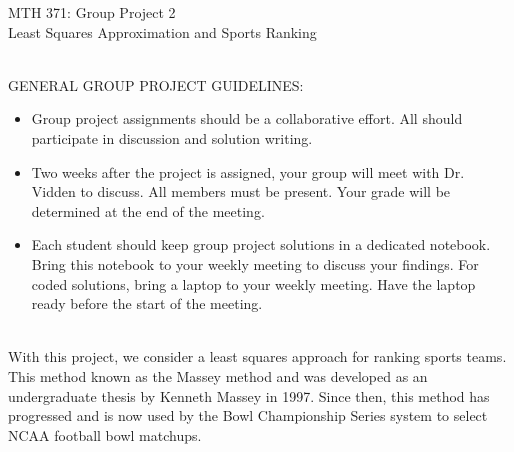 \documentclass[addpoints, 11pt]{exam}
\begin{document}
\vspace{100mm}
\begin{center} \Large
MTH 371: Group Project 2 \\ Least Squares Approximation and Sports Ranking \normalsize
\end{center}
\ \\
\noindent GENERAL GROUP PROJECT GUIDELINES: 
\begin{itemize}
\item Group project assignments should be a collaborative effort. All should participate in discussion and solution writing. \vspace{-2mm}
\item Two weeks after the project is assigned, your group will meet with Dr. Vidden to discuss. All members must be present. Your grade will be determined at the end of the meeting. \vspace{-2mm}
\item Each student should keep group project solutions in a dedicated notebook. Bring this notebook to your weekly meeting to discuss your findings. For coded solutions, bring a laptop to your weekly meeting. Have the laptop ready before the start of the meeting. \vspace{-2mm}
\end{itemize}
\ \\

With this project, we consider a least squares approach for ranking sports teams. This method known as the Massey method and was developed as an undergraduate thesis by Kenneth Massey in 1997. Since then, this method has progressed and is now used by the Bowl Championship Series system to select NCAA football bowl matchups.
\end{document}

